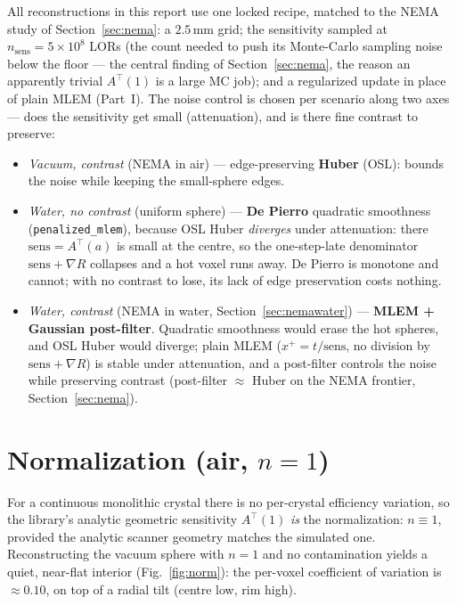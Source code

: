 \documentclass[11pt]{article}
\newcommand{\code}[1]{\texttt{#1}}
\begin{document}
All reconstructions in this report use one locked recipe, matched to the NEMA study
of Section~\ref{sec:nema}: a $2.5$\,mm grid; the sensitivity sampled at
$n_{\text{sens}}=5\times10^{8}$ LORs (the count needed to push its Monte-Carlo
sampling noise below the floor --- the central finding of Section~\ref{sec:nema},
the reason an apparently trivial $A^{\!\top}(1)$ is a large MC job); and a
regularized update in place of plain MLEM (Part~I). The noise control is chosen per
scenario along two axes --- does the sensitivity get small (attenuation), and is there
fine contrast to preserve:
\begin{itemize}
  \item \emph{Vacuum, contrast} (NEMA in air) --- edge-preserving \textbf{Huber} (OSL):
        bounds the noise while keeping the small-sphere edges.
  \item \emph{Water, no contrast} (uniform sphere) --- \textbf{De Pierro} quadratic
        smoothness (\code{penalized\_mlem}), because OSL Huber \emph{diverges} under
        attenuation: there $\text{sens}=A^{\!\top}(a)$ is small at the centre, so the
        one-step-late denominator $\text{sens}+\nabla R$ collapses and a hot voxel runs
        away. De Pierro is monotone and cannot; with no contrast to lose, its lack of
        edge preservation costs nothing.
  \item \emph{Water, contrast} (NEMA in water, Section~\ref{sec:nemawater}) ---
        \textbf{MLEM + Gaussian post-filter}. Quadratic smoothness would erase the hot
        spheres, and OSL Huber would diverge; plain MLEM ($x^{+}=t/\text{sens}$, no
        division by $\text{sens}+\nabla R$) is stable under attenuation, and a post-filter
        controls the noise while preserving contrast (post-filter $\approx$ Huber on the
        NEMA frontier, Section~\ref{sec:nema}).
\end{itemize}

\section{Normalization (air, $n=1$)}

For a continuous monolithic crystal there is no per-crystal efficiency variation,
so the library's analytic geometric sensitivity $A^{\!\top}(1)$ \emph{is} the
normalization: $n\equiv 1$, provided the analytic scanner geometry matches the
simulated one. Reconstructing the vacuum sphere with $n=1$ and no contamination
yields a quiet, near-flat interior (Fig.~\ref{fig:norm}): the per-voxel coefficient
of variation is $\approx 0.10$, on top of a radial tilt (centre low, rim high).
\end{document}
